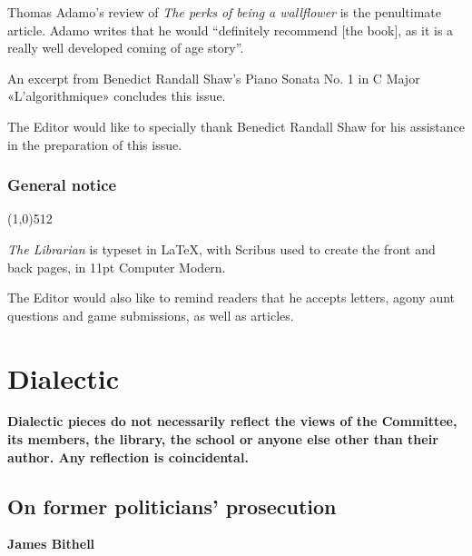 \documentclass[11pt,a4paper]{report}
\let\origsection\subsection
\renewcommand{\subsection}[1]{\origsection{#1}\vspace{-0.5em}\line(1,0){512}\vspace{-1em}}
\begin{document}
\begin{multicols}{2}
		Thomas Adamo's review of \textit{The perks of being a wallflower} is the penultimate article. Adamo writes that he would ``definitely recommend [the book], as it is a really well developed coming of age story''. 
		
		An excerpt from Benedict Randall Shaw's Piano Sonata No. 1 in C Major «L'algorithmique» concludes this issue.
		
		The Editor would like to specially thank Benedict Randall Shaw for his assistance in the preparation of this issue.
		
	\end{multicols}
	
	\subsection{General notice}
	\begin{multicols}{2}
		\textit{The Librarian} is typeset in \LaTeX, with Scribus used to create the front and back pages, in 11pt Computer Modern.
		
		The Editor would also like to remind readers that he accepts letters, agony aunt questions and game submissions, as well as articles. 
		
	\end{multicols}
	
	\chapter{Dialectic}
	
	\textbf{Dialectic pieces do not necessarily reflect the views of the Committee, its members, the library, the school or anyone else other than their author. Any reflection is coincidental.}
	
	\section{On former politicians' prosecution}
	
	\textbf{James Bithell}
	
\end{document}
